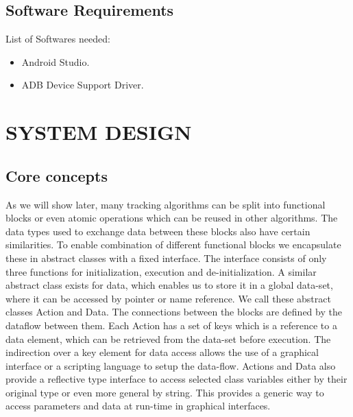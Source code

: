 \documentclass{article}
\begin{document}
\subsection{Software Requirements}
\par List of Softwares needed:
\begin{itemize}
\item Android Studio.
\item ADB Device Support Driver.
\end{itemize}


\newpage
\section{SYSTEM DESIGN }
\subsection{Core concepts }
\par As we will show later, many tracking algorithms can be split into functional blocks or even atomic operations which can be reused in other algorithms. The data types used to exchange data between these blocks also have certain similarities. To enable combination of different functional blocks we encapsulate these in abstract classes with a ﬁxed interface. The interface consists of only three functions for initialization, execution and de-initialization. A similar abstract class exists for data, which enables us to store it in a global data-set, where it can be accessed by pointer or name reference. We call these abstract classes Action and Data. The connections between the blocks are deﬁned by the dataﬂow between them. Each Action has a set of keys which is a reference to a data element, which can be retrieved from the data-set before execution. The indirection over a key element for data access allows the use of a graphical interface or a scripting language to setup the data-ﬂow. Actions and Data also provide a reﬂective type interface to access selected class variables either by their original type or even more general by string. This provides a generic way to access parameters and data at run-time in graphical interfaces.  
\end{document}
